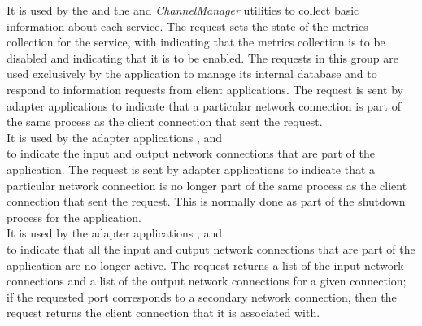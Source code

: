It is used by the  and the
 and \emph{ChannelManager} utilities to collect basic
information about each service.
The  request sets the state of the metrics
collection for the service, with  indicating that the metrics collection is
to be disabled and  indicating that it is to be enabled.
\secondaryEnd{}
The requests in this group are used exclusively by the
 application to manage its internal
database and to respond to information requests from client applications.
The  request is sent by
adapter applications to indicate that a particular \yarp{} network connection is part of
the same process as the client connection that sent the request.\\

It is used by the adapter applications ,
 and\\
 to indicate the input and output
\yarp{} network connections that are part of the application.
The  request is sent by
adapter applications to indicate that a particular \yarp{} network connection is no
longer part of the same process as the client connection that sent the request.
This is normally done as part of the shutdown process for the application.\\

It is used by the adapter applications ,
 and\\
 to indicate that all the input and
output \yarp{} network connections that are part of the application are no longer active.
The  request returns
a list of the input \yarp{} network connections and a list of the output \yarp{} network
connections for a given connection; if the requested port corresponds to a secondary
\yarp{} network connection, then the request returns the client connection that it is
associated with.\\


